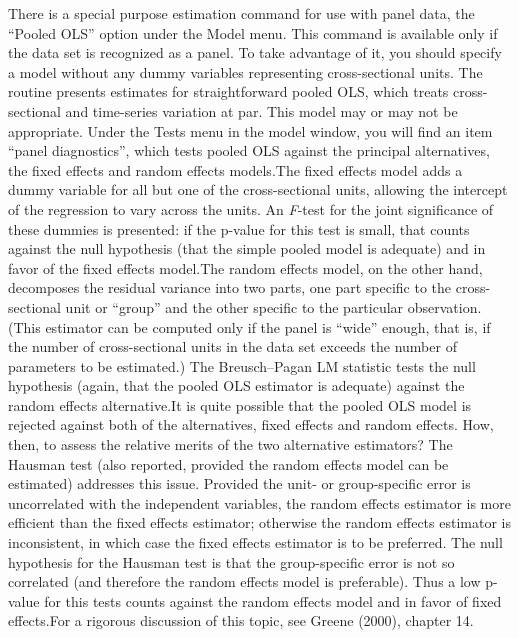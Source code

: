 There is a special purpose estimation command for use with
      panel data, the ``Pooled OLS'' option under the
      \textsf{Model} menu. This command is available only if
      the data set is recognized as a panel.  To take advantage of it,
      you should specify a model without any dummy variables
      representing cross-sectional units.  The routine presents
      estimates for straightforward pooled OLS, which treats
      cross-sectional and time-series variation at par.  This model
      may or may not be appropriate.  Under the
      \textsf{Tests} menu in the model window, you will find
      an item ``panel diagnostics'', which tests pooled OLS
      against the principal alternatives, the fixed effects and random
      effects models.The fixed effects model adds a dummy variable for all but
      one of the cross-sectional units, allowing the intercept of the
      regression to vary across the units.  An
      \emph{F}-test for the joint significance of these
      dummies is presented: if the p-value for this test is small,
      that counts against the null hypothesis (that the simple pooled
      model is adequate) and in favor of the fixed effects
      model.The random effects model, on the other hand, decomposes the
      residual variance into two parts, one part specific to the
      cross-sectional unit or ``group'' and the other
      specific to the particular observation.  (This estimator can be
      computed only if the panel is ``wide'' enough, that
      is, if the number of cross-sectional units in the data set
      exceeds the number of parameters to be estimated.)  The
      Breusch--Pagan LM statistic tests the null hypothesis
      (again, that the pooled OLS estimator is adequate) against the
      random effects alternative.It is quite possible that the pooled OLS model is rejected
      against both of the alternatives, fixed effects and random
      effects. How, then, to assess the relative merits of the two
      alternative estimators?  The Hausman test (also reported,
      provided the random effects model can be estimated) addresses
      this issue.  Provided the unit- or group-specific error is
      uncorrelated with the independent variables, the random effects
      estimator is more efficient than the fixed effects estimator;
      otherwise the random effects estimator is inconsistent, in which
      case the fixed effects estimator is to be preferred.  The null
      hypothesis for the Hausman test is that the group-specific error
      is not so correlated (and therefore the random effects model is
      preferable).  Thus a low p-value for this tests counts against
      the random effects model and in favor of fixed effects.For a rigorous discussion of this topic, see Greene (2000),
      chapter 14.


